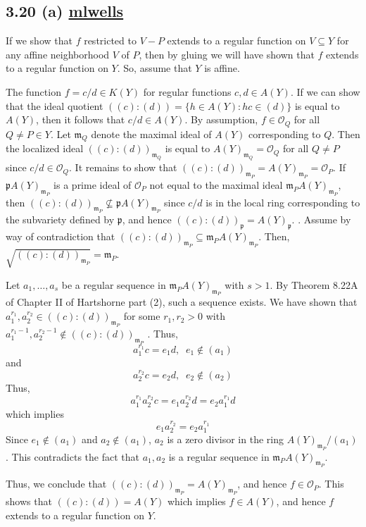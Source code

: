     \subsection*{3.20 (a)   \href{https://github.com/mikeleew}{mlwells}
}


If we show that $f$ restricted to $V - P$ extends to a regular function on $V \subseteq Y$ for any affine neighborhood $V$ of $P$,
then by gluing we will have shown that $f$ extends to a regular function on $Y$.  So, assume that $Y$ is affine.

The function $f = c/d \in K(Y)$ for regular functions $c, d \in A(Y)$.  If we can show that the ideal quotient
$((c) : (d)) = \{h \in A(Y) \colon hc \in (d)\}$ is equal to $A(Y)$, then it follows that $c/d \in A(Y)$.  By assumption,
$f \in \mathcal{O}_Q$ for all $ Q \neq P \in Y$.  Let $\mathfrak{m}_Q$ denote the maximal ideal of $A(Y)$ corresponding to $Q$.
Then the localized ideal $((c) : (d))_{\mathfrak{m}_Q}$ is equal to $A(Y)_{\mathfrak{m}_Q} = \mathcal{O}_Q$ for all $Q \neq P$ since $c/d \in \mathcal{O}_Q$.  It remains
to show that $((c) : (d))_{\mathfrak{m}_P} = A(Y)_{\mathfrak{m}_P} = \mathcal{O}_P$.  If $\mathfrak{p} A(Y)_{\mathfrak{m}_P}$ is a prime ideal of
$\mathcal{O}_P$ not equal to the maximal ideal $\mathfrak{m}_P A(Y)_{\mathfrak{m}_P}$, then $((c) : (d))_{\mathfrak{m}_P} \not\subseteq \mathfrak{p}A(Y)_{\mathfrak{m}_P}$
since $c/d$ is in the local ring corresponding to the subvariety defined by $\mathfrak{p}$, and hence
$((c) : (d))_{\mathfrak{p}} = A(Y)_{\mathfrak{p}}$.
.  Assume by way of contradiction
that $((c) : (d))_{\mathfrak{m}_P} \subseteq \mathfrak{m}_P A(Y)_{\mathfrak{m}_P}$. Then, $\sqrt{((c) : (d))_{\mathfrak{m}_P}} = \mathfrak{m}_P$.

Let $a_1, \ldots, a_s$ be a regular sequence in $\mathfrak{m}_P A(Y)_{\mathfrak{m}_P}$ with $s > 1$.  By Theorem 8.22A of
Chapter II of Hartshorne part (2), such a sequence exists.  We have shown that $a_1^{r_1}, a_2^{r_2} \in ((c): (d))_{\mathfrak{m}_P}$
for some $r_1, r_2 > 0$ with $a_1^{r_1-1}, a_2^{r_2-1} \notin ((c) : (d))_{\mathfrak{m}_P}$  .  Thus,
\begin{equation}
    a_1^{r_1} c = e_1 d, \;\; e_1 \notin (a_1)
\end{equation}
and
\begin{equation}
    a_2^{r_2} c = e_2 d, \;\; e_2 \notin (a_2)
\end{equation}
Thus,
\begin{equation}
    a_1^{r_1} a_2^{r_2} c = e_1 a_2^{r_2} d = e_2 a_1^{r_1} d
\end{equation}
which implies
\begin{equation}
    e_1 a_2^{r_2} = e_2 a_1^{r_1}
\end{equation}
Since $e_1 \notin (a_1)$ and $a_2 \notin (a_1)$, $a_2$  is a zero divisor in the ring $A(Y)_{\mathfrak{m}_P}/(a_1)$.  This
contradicts the fact that $a_1, a_2$ is a regular sequence in $\mathfrak{m}_P A(Y)_{\mathfrak{m}_P}$.

Thus, we conclude that $((c) : (d))_{\mathfrak{m}_P} = A(Y)_{\mathfrak{m}_P}$, and hence $f \in \mathcal{O}_P$.  This
shows that $((c): (d)) = A(Y)$ which implies $f \in A(Y)$, and hence $f$ extends to a regular function on $Y$.